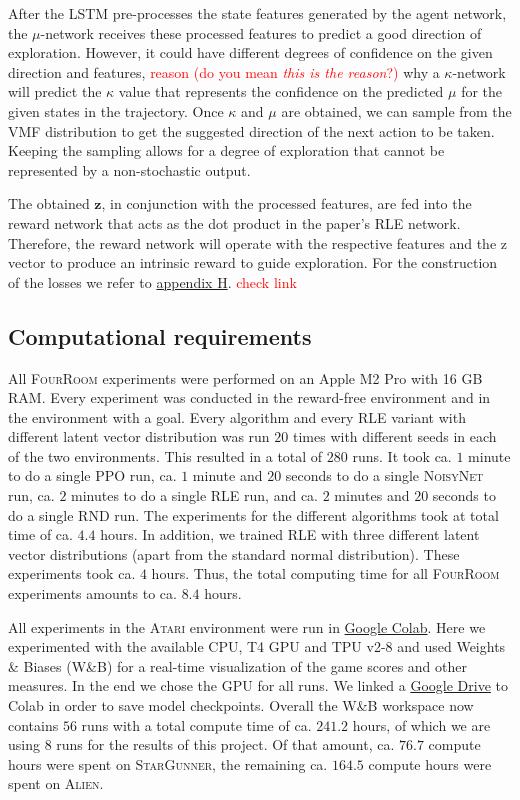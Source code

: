 \documentclass[10pt]{article} %
\begin{document}
After the LSTM pre-processes the state features generated by the agent network, the $\mu$-network receives these processed features to predict a good direction of exploration. However, it could have different degrees of confidence on the given direction and features, \textcolor{red}{reason (do you mean \textit{this is the reason}?)} why a $\kappa$-network will predict the $\kappa$ value that represents the confidence on the predicted $\mu$ for the given states in the trajectory. Once $\kappa$ and $\mu$ are obtained, we can sample from the VMF distribution to get the suggested direction of the next action to be taken. Keeping the sampling allows for a degree of exploration that cannot be represented by a non-stochastic output. 

The obtained $\textbf{z}$, in conjunction with the processed features, are fed into the reward network that acts as the dot product in the paper's \textsc{RLE} network. Therefore, the reward network will operate with the respective features and the z vector to produce an intrinsic reward to guide exploration. For the construction of the losses we refer to \hyperlink{na-vmf}{appendix H}. \textcolor{red}{check link}

\hypertarget{computational-requirements}{\subsection{Computational requirements}}

All \textsc{FourRoom} experiments were performed on an Apple M2 Pro with 16 GB RAM. Every experiment was conducted in the reward-free environment and in the environment with a goal. Every algorithm and every \textsc{RLE} variant with different latent vector distribution was run $20$ times with different seeds in each of the two environments. This resulted in a total of $280$ runs. It took ca. $1$ minute to do a single \textsc{PPO} run, ca. $1$ minute and $20$ seconds to do a single \textsc{NoisyNet} run, ca. $2$ minutes to do a single \textsc{RLE} run, and ca. $2$ minutes and $20$ seconds to do a single \textsc{RND} run. The experiments for the different algorithms took at total time of ca. $4.4$ hours. In addition, we trained \textsc{RLE} with three different latent vector distributions (apart from the standard normal distribution). These experiments took ca. $4$ hours. Thus, the total computing time for all \textsc{FourRoom} experiments amounts to ca. $8.4$ hours.

\noindent All experiments in the \textsc{Atari} environment were run in \href{https://colab.research.google.com/}{Google Colab}. Here we experimented with the available CPU, T4 GPU and TPU v2-8 and used Weights \& Biases (W\&B) for a real-time visualization of the game scores and other measures. In the end we chose the GPU for all runs. We linked a \href{https://drive.google.com}{Google Drive} to Colab in order to save model checkpoints. Overall the W\&B workspace now contains $56$ runs with a total compute time of ca. $241.2$ hours, of which we are using $8$ runs for the results of this project. Of that amount, ca. $76.7$ compute hours were spent on \textsc{StarGunner}, the remaining ca. $164.5$ compute hours were spent on \textsc{Alien}.
\end{document}
